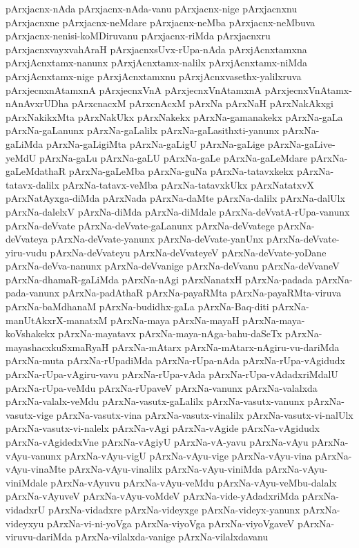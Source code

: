 {pArxjacnx-nAda
pArxjacnx-nAda-vanu
pArxjacnx-nige
pArxjacnxnu
pArxjacnxne
pArxjacnx-neMdare
pArxjacnx-neMba
pArxjacnx-neMbuva
pArxjacnx-nenisi-koMDiruvanu
pArxjacnx-riMda
pArxjacnxru
pArxjacnxvayxvahAraH
pArxjacnxsUvx-rUpa-nAda
pArxjAcnxtamxna
pArxjAcnxtamx-nanunx
pArxjAcnxtamx-nalilx
pArxjAcnxtamx-niMda
pArxjAcnxtamx-nige
pArxjAcnxtamxnu
pArxjAcnxvasethx-yalilxruva
pArxjecnxnAtamxnA
pArxjecnxVnA
pArxjecnxVnAtamxnA
pArxjecnxVnAtamx-nAnAvxrUDha
pArxcnacxM
pArxcnAcxM
pArxNa
pArxNaH
pArxNakAkxgi
pArxNakikxMta
pArxNakUkx
pArxNakekx
pArxNa-gamanakekx
pArxNa-gaLa
pArxNa-gaLanunx
pArxNa-gaLalilx
pArxNa-gaLasithxti-yanunx
pArxNa-gaLiMda
pArxNa-gaLigiMta
pArxNa-gaLigU
pArxNa-gaLige
pArxNa-gaLive-yeMdU
pArxNa-gaLu
pArxNa-gaLU
pArxNa-gaLe
pArxNa-gaLeMdare
pArxNa-gaLeMdathaR
pArxNa-gaLeMba
pArxNa-guNa
pArxNa-tatavxkekx
pArxNa-tatavx-dalilx
pArxNa-tatavx-veMba
pArxNa-tatavxkUkx
pArxNatatxvX
pArxNatAyxga-diMda
pArxNada
pArxNa-daMte
pArxNa-dalilx
pArxNa-dalUlx
pArxNa-dalelxV
pArxNa-diMda
pArxNa-diMdale
pArxNa-deVvatA-rUpa-vanunx
pArxNa-deVvate
pArxNa-deVvate-gaLanunx
pArxNa-deVvatege
pArxNa-deVvateya
pArxNa-deVvate-yanunx
pArxNa-deVvate-yanUnx
pArxNa-deVvate-yiru-vudu
pArxNa-deVvateyu
pArxNa-deVvateyeV
pArxNa-deVvate-yoDane
pArxNa-deVva-nanunx
pArxNa-deVvanige
pArxNa-deVvanu
pArxNa-deVvaneV
pArxNa-dhamaR-gaLiMda
pArxNa-nAgi
pArxNanatxH
pArxNa-padada
pArxNa-pada-vanunx
pArxNa-padAthaR
pArxNa-payaRMta
pArxNa-payaRMta-viruva
pArxNa-baMdhanaM
pArxNa-budidhx-gaLa
pArxNa-Baq-diti
pArxNa-manUtAkxrX-manatxM
pArxNa-maya
pArxNa-mayaH
pArxNa-maya-koVshakekx
pArxNa-mayatavx
pArxNa-maya-nAga-bahu-daSeTx
pArxNa-mayashacxkuSxmaRyaH
pArxNa-mAtarx
pArxNa-mAtarx-nAgiru-vu-dariMda
pArxNa-muta
pArxNa-rUpadiMda
pArxNa-rUpa-nAda
pArxNa-rUpa-vAgidudx
pArxNa-rUpa-vAgiru-vavu
pArxNa-rUpa-vAda
pArxNa-rUpa-vAdadxriMdalU
pArxNa-rUpa-veMdu
pArxNa-rUpaveV
pArxNa-vanunx
pArxNa-valalxda
pArxNa-valalx-veMdu
pArxNa-vasutx-gaLalilx
pArxNa-vasutx-vanunx
pArxNa-vasutx-vige
pArxNa-vasutx-vina
pArxNa-vasutx-vinalilx
pArxNa-vasutx-vi-nalUlx
pArxNa-vasutx-vi-nalelx
pArxNa-vAgi
pArxNa-vAgide
pArxNa-vAgidudx
pArxNa-vAgidedxVne
pArxNa-vAgiyU
pArxNa-vA-yavu
pArxNa-vAyu
pArxNa-vAyu-vanunx
pArxNa-vAyu-vigU
pArxNa-vAyu-vige
pArxNa-vAyu-vina
pArxNa-vAyu-vinaMte
pArxNa-vAyu-vinalilx
pArxNa-vAyu-viniMda
pArxNa-vAyu-viniMdale
pArxNa-vAyuvu
pArxNa-vAyu-veMdu
pArxNa-vAyu-veMbu-dalalx
pArxNa-vAyuveV
pArxNa-vAyu-voMdeV
pArxNa-vide-yAdadxriMda
pArxNa-vidadxrU
pArxNa-vidadxre
pArxNa-videyxge
pArxNa-videyx-yanunx
pArxNa-videyxyu
pArxNa-vi-ni-yoVga
pArxNa-viyoVga
pArxNa-viyoVgaveV
pArxNa-viruvu-dariMda
pArxNa-vilalxda-vanige
pArxNa-vilalxdavanu
}
